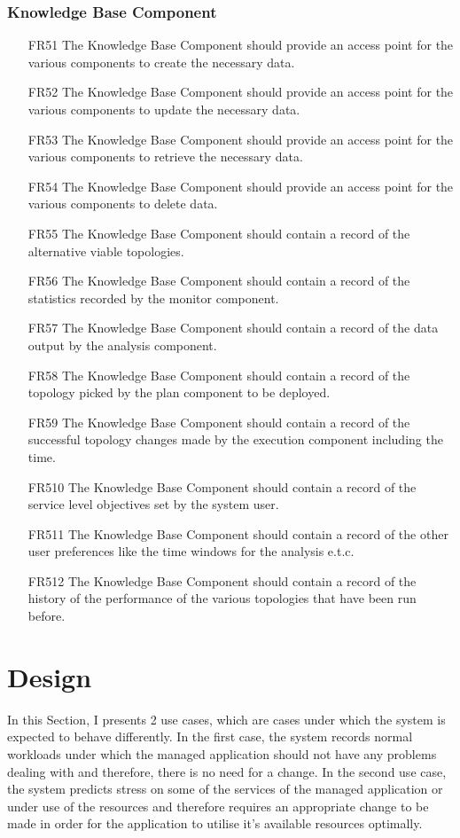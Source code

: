 \subsubsection{\textbf{Knowledge Base Component}}
\begin{itemize}
    \item [FR51] The Knowledge Base Component should provide an access point for the various components to create the necessary data.
    \item [FR52] The Knowledge Base Component should provide an access point for the various components to update the necessary data.
    \item [FR53] The Knowledge Base Component should provide an access point for the various components to retrieve the necessary data.
    \item [FR54] The Knowledge Base Component should provide an access point for the various components to delete data.
    \item [FR55] The Knowledge Base Component should contain a record of the alternative viable topologies.
    \item [FR56] The Knowledge Base Component should contain a record of the statistics recorded by the monitor component.
    \item [FR57] The Knowledge Base Component should contain a record of the data output by the analysis component.
    \item [FR58] The Knowledge Base Component should contain a record of the topology picked by the plan component to be deployed.
    \item [FR59] The Knowledge Base Component should contain a record of the successful topology changes made by the execution component including the time.
    \item [FR510] The Knowledge Base Component should contain a record of the service level objectives set by the system user.
    \item [FR511] The Knowledge Base Component should contain a record of the other user preferences like the time windows for the analysis e.t.c.
    \item [FR512] The Knowledge Base Component should contain a record of the history of the performance of the various topologies that have been run before.
\end{itemize}

\section{Design} %
In this Section, I presents 2 use cases, which are cases under which the system is expected to behave differently. In the first case, the system records normal workloads under which the managed application should not have any problems dealing with and therefore, there is no need for a change. In the second use case, the system predicts stress on some of the services of the managed application or under use of the resources and therefore requires an appropriate change to be made in order for the application to utilise it's available resources optimally.
